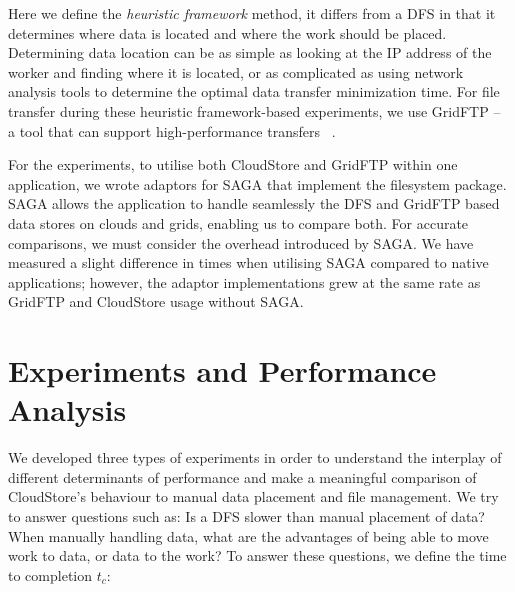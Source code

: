 \documentclass{rspublic}
\begin{document}
Here we define the \textit{heuristic framework} method, it differs from
a DFS in that it determines where data is located and where the work
should be placed. Determining data location can be as simple as looking
at the IP address of the worker and finding where it is located, or as
complicated as using network analysis tools to determine the optimal
data transfer minimization time. For file transfer during these
heuristic framework-based experiments, we use GridFTP -- a tool that can
support high-performance transfers ~\citep{gridftp_web}.

For the experiments, to utilise both CloudStore and GridFTP within one
application, we wrote adaptors for SAGA that implement the filesystem
package. SAGA allows the application to handle seamlessly the DFS and
GridFTP based data stores on clouds and grids, enabling us to compare
both. For accurate comparisons, we must consider the overhead
introduced by SAGA. We have measured a slight difference in times when
utilising SAGA compared to native applications; however, the adaptor
implementations grew at the same rate as GridFTP and CloudStore usage
without SAGA. 


\vspace{-0.5cm}

\section{Experiments and Performance Analysis} 
We developed three types of experiments in order to understand the
interplay of different determinants of performance and make a meaningful
comparison of CloudStore's behaviour to manual data placement and file
management. We try to answer questions such as: Is a DFS slower than
manual placement of data? When manually handling data, what are the
advantages of being able to move work to data, or data to the work? To
answer these questions, we define the time to completion $t_c$:
\end{document}
